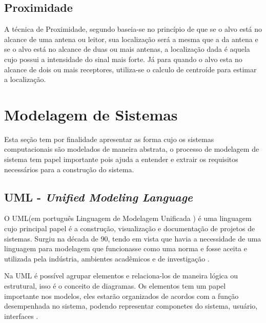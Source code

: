     \subsection{Proximidade}
    A técnica de Proximidade, segundo \citeauthor{rfidProximity} baseia-se no princípio de que se o alvo está no alcance de uma antena ou leitor, sua localização será a mesma que a da antena e se o alvo está no alcance de duas ou mais antenas, a localização dada é aquela cujo possui a intensidade do sinal mais forte. Já para \citeauthor{rfid2009review} quando o alvo esta no alcance de dois ou mais receptores, utiliza-se o calculo de centroíde para estimar a localização.
    
\section{Modelagem de Sistemas}
    Esta seção tem por finalidade apresentar as forma cujo os sistemas computacionais são modelados de maneira abstrata, o processo de modelagem de sistema tem papel importante pois ajuda a entender e extrair os requisitos necessários para a construção do sistema.
    \subsection{UML - \textit{Unified Modeling Language}}
    O UML(em português Linguagem de Modelagem Unificada ) é uma linguagem cujo principal papel é a construção, visualização e documentação de projetos de sistemas. Surgiu na década de 90, tendo em vista que havia a necessidade de uma linguagem para modelagem que funcionasse como uma norma e fosse aceita e utilizada pela indústria, ambientes acadêmicos e de investigação \cite{uml}.
    \par
    Na UML é possível agrupar elementos e relaciona-los de maneira lógica ou estrutural, isso é o conceito de diagramas. Os elementos tem um papel importante nos modelos, eles estarão organizados de acordos com a função desempenhada no sistema, podendo representar componetes do sistema, usuário, interfaces \cite{uml}.
    
